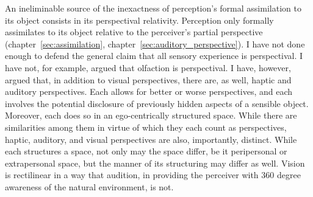 An ineliminable source of the inexactness of perception's formal assimilation to its object consists in its perspectival relativity. Perception only formally assimilates to its object relative to the perceiver's partial perspective (chapter~\ref{sec:assimilation}, chapter~\ref{sec:auditory_perspective}). I have not done enough to defend the general claim that all sensory experience is perspectival. I have not, for example, argued that olfaction is perspectival. I have, however, argued that, in addition to visual perspectives, there are, as well, haptic and auditory perspectives. Each allows for better or worse perspectives, and each involves the potential disclosure of previously hidden aspects of a sensible object. Moreover, each does so in an ego-centrically structured space. While there are similarities among them in virtue of which they each count as perspectives, haptic, auditory, and visual perspectives are also, importantly, distinct. While each structures a space, not only may the space differ, be it peripersonal or extrapersonal space, but the manner of its structuring may differ as well. Vision is rectilinear in a way that audition, in providing the perceiver with 360 degree awareness of the natural environment, is not.


